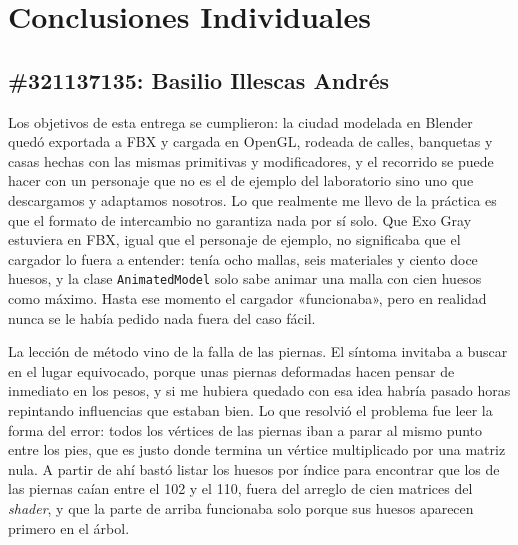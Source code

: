
\section{Conclusiones Individuales}

\subsection*{\#321137135: Basilio Illescas Andrés}
Los objetivos de esta entrega se cumplieron: la ciudad modelada en Blender quedó exportada a FBX y cargada en OpenGL, rodeada de calles, banquetas y casas hechas con las mismas primitivas y modificadores, y el recorrido se puede hacer con un personaje que no es el de ejemplo del laboratorio sino uno que descargamos y adaptamos nosotros. Lo que realmente me llevo de la práctica es que el formato de intercambio no garantiza nada por sí solo. Que Exo Gray estuviera en FBX, igual que el personaje de ejemplo, no significaba que el cargador lo fuera a entender: tenía ocho mallas, seis materiales y ciento doce huesos, y la clase \texttt{AnimatedModel} solo sabe animar una malla con cien huesos como máximo. Hasta ese momento el cargador «funcionaba», pero en realidad nunca se le había pedido nada fuera del caso fácil.

La lección de método vino de la falla de las piernas. El síntoma invitaba a buscar en el lugar equivocado, porque unas piernas deformadas hacen pensar de inmediato en los pesos, y si me hubiera quedado con esa idea habría pasado horas repintando influencias que estaban bien. Lo que resolvió el problema fue leer la forma del error: todos los vértices de las piernas iban a parar al mismo punto entre los pies, que es justo donde termina un vértice multiplicado por una matriz nula. A partir de ahí bastó listar los huesos por índice para encontrar que los de las piernas caían entre el 102 y el 110, fuera del arreglo de cien matrices del \textit{shader}, y que la parte de arriba funcionaba solo porque sus huesos aparecen primero en el árbol.

